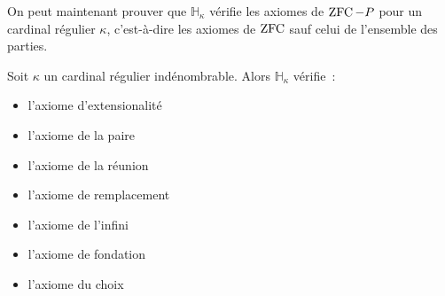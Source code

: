 On peut maintenant prouver que $\mathbb H_\kappa$ vérifie les axiomes de
$\operatorname{ZFC} - P$ pour un cardinal régulier $\kappa$, c'est-à-dire les axiomes de
$\operatorname{ZFC}$ sauf celui de l'ensemble des parties.

\begin{property}
  Soit $\kappa$ un cardinal régulier indénombrable. Alors $\mathbb H_\kappa$
  vérifie~:
  \begin{itemize}
  \item l'axiome d'extensionalité
  \item l'axiome de la paire
  \item l'axiome de la réunion
  \item l'axiome de remplacement
  \item l'axiome de l'infini
  \item l'axiome de fondation
  \item l'axiome du choix
  \end{itemize}
\end{property}

